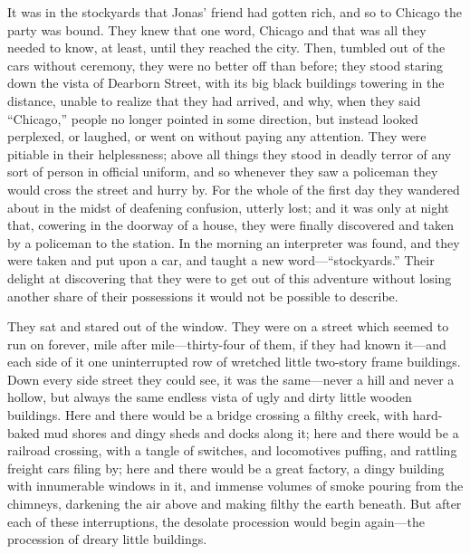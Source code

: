 \documentclass[
]{book}
\theoremstyle{definition}
\theoremstyle{definition}
\theoremstyle{definition}
\theoremstyle{definition}
\theoremstyle{remark}
\begin{document}
It was in the stockyards that Jonas' friend had gotten rich, and so to Chicago the party was bound. They knew that one word, Chicago and that was all they needed to know, at least, until they reached the city. Then, tumbled out of the cars without ceremony, they were no better off than before; they stood staring down the vista of Dearborn Street, with its big black buildings towering in the distance, unable to realize that they had arrived, and why, when they said ``Chicago,'' people no longer pointed in some direction, but instead looked perplexed, or laughed, or went on without paying any attention. They were pitiable in their helplessness; above all things they stood in deadly terror of any sort of person in official uniform, and so whenever they saw a policeman they would cross the street and hurry by. For the whole of the first day they wandered about in the midst of deafening confusion, utterly lost; and it was only at night that, cowering in the doorway of a house, they were finally discovered and taken by a policeman to the station. In the morning an interpreter was found, and they were taken and put upon a car, and taught a new word---``stockyards.'' Their delight at discovering that they were to get out of this adventure without losing another share of their possessions it would not be possible to describe.

They sat and stared out of the window. They were on a street which seemed to run on forever, mile after mile---thirty-four of them, if they had known it---and each side of it one uninterrupted row of wretched little two-story frame buildings. Down every side street they could see, it was the same---never a hill and never a hollow, but always the same endless vista of ugly and dirty little wooden buildings. Here and there would be a bridge crossing a filthy creek, with hard-baked mud shores and dingy sheds and docks along it; here and there would be a railroad crossing, with a tangle of switches, and locomotives puffing, and rattling freight cars filing by; here and there would be a great factory, a dingy building with innumerable windows in it, and immense volumes of smoke pouring from the chimneys, darkening the air above and making filthy the earth beneath. But after each of these interruptions, the desolate procession would begin again---the procession of dreary little buildings.
\end{document}
